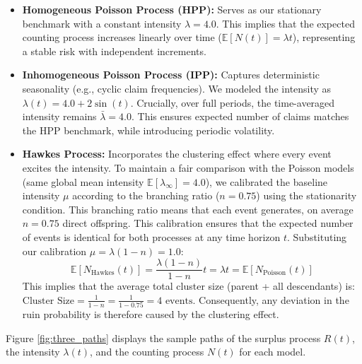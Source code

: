 \documentclass[a4paper,11pt]{article}
\begin{document}
\begin{itemize}
    \item \textbf{Homogeneous Poisson Process (HPP):} 
    Serves as our stationary benchmark with a constant intensity $\lambda = 4.0$. 
    This implies that the expected counting process increases linearly over time ($\mathbb{E}[N(t)] = \lambda t$), representing a stable risk with independent increments.
    \item \textbf{Inhomogeneous Poisson Process (IPP):} 
    Captures deterministic seasonality (e.g., cyclic claim frequencies). 
    We modeled the intensity as $\lambda(t) = 4.0 + 2\sin(t)$. 
    Crucially, over full periods, the time-averaged intensity remains $\bar{\lambda} = 4.0$. This ensures expected number of claims matches the HPP benchmark, while introducing periodic volatility.
    \item \textbf{Hawkes Process:} 
    Incorporates the clustering effect where every event excites the intensity. 
    To maintain a fair comparison with the Poisson models (same global mean intensity $\mathbb{E}[\lambda_{\infty}] = 4.0$), we calibrated the baseline intensity $\mu$ according to the branching ratio ($n=0.75$) using the stationarity condition. This branching ratio means that each event generates, on average $n=0.75$ direct offspring. 
    This calibration ensures that the expected number of events is identical for both processes at any time horizon $t$.
    Substituting our calibration $\mu = \lambda (1-n) = 1.0$:
    $$ \mathbb{E}[N_{\text{Hawkes}}(t)] = \frac{\lambda (1-n)}{1-n} t = \lambda t = \mathbb{E}[N_{\text{Poisson}}(t)] $$
    This implies that the average total cluster size (parent + all descendants) is:  $\text{Cluster Size} = \frac{1}{1-n} = \frac{1}{1-0.75} = 4 \text{ events} $.
    Consequently, any deviation in the ruin probability is therefore caused by the clustering effect.
\end{itemize}

Figure \ref{fig:three_paths} displays the sample paths of the surplus process $R(t)$, the intensity $\lambda(t)$, and the counting process $N(t)$ for each model.
\end{document}
